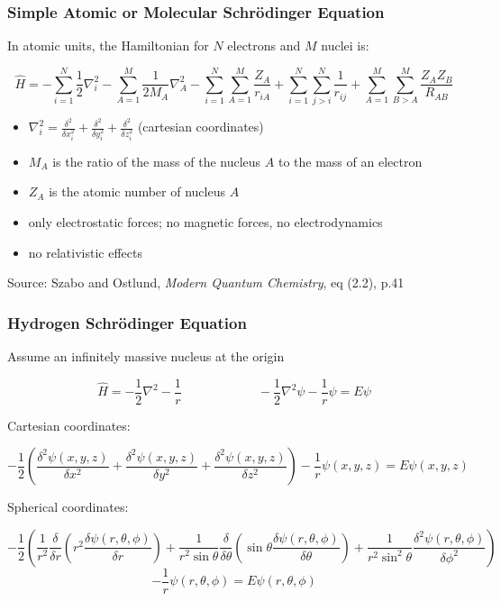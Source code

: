 \documentclass{beamer}
\begin{document}
\begin{frame}
\frametitle{Simple Atomic or Molecular Schr\"odinger Equation}

In atomic units, the Hamiltonian for $N$ electrons and $M$ nuclei is:

\[ \hat{H} = - \sum_{i=1}^N \frac{1}{2} \nabla_i^2 - \sum_{A=1}^M \frac{1}{2M_A}\nabla_A^2 - \sum_{i=1}^{N}\sum_{A=1}^M \frac{Z_A}{r_{iA}}
+ \sum_{i=1}^{N}\sum_{j>i}^N \frac{1}{r_{ij}} + \sum_{A=1}^{M}\sum_{B>A}^M \frac{Z_A Z_B}{R_{AB}}
 \]

\begin{itemize}
\item $ \nabla_i^2 = \frac{\delta^2}{\delta x_i^2} + \frac{\delta^2}{\delta y_i^2} + \frac{\delta^2}{\delta z_i^2}$ (cartesian coordinates)
\item $M_A$ is the ratio of the mass of the nucleus $A$ to the mass of an electron
\item $Z_A$ is the atomic number of nucleus $A$
\item only electrostatic forces; no magnetic forces, no electrodynamics
\item no relativistic effects
\end{itemize}

\vfill
Source: Szabo and Ostlund, {\it Modern Quantum Chemistry}, eq (2.2), p.41
\end{frame}

\begin{frame}
\frametitle{Hydrogen Schr\"odinger Equation}

\begin{center}

Assume an infinitely massive nucleus at the origin

\[ \hat{H} = - \frac{1}{2} \nabla^2 - \frac{1}{r}  \qquad\qquad\qquad - \frac{1}{2} \nabla^2 \psi - \frac{1}{r} \psi = E \psi \]

Cartesian coordinates:

\[ - \frac{1}{2} \left( \frac{\delta^2 \psi(x,y,z)}{\delta x^2} + \frac{\delta^2 \psi(x,y,z)}{\delta y^2} + \frac{\delta^2 \psi(x,y,z)}{\delta z^2} \right) - \frac{1}{r} \psi(x,y,z) = E \psi(x,y,z) \]

Spherical coordinates:

\scriptsize
\[ - \frac{1}{2} \left( \frac{1}{r^2} \frac{\delta}{\delta r}\left(r^2\frac{\delta \psi(r,\theta,\phi)}{\delta r}\right) + \frac{1}{r^2\sin\theta} \frac{\delta}{\delta \theta}\left(\sin\theta\frac{\delta \psi(r,\theta,\phi)}{\delta\theta}\right) + \frac{1}{r^2 \sin^2\theta}\frac{\delta^2 \psi(r,\theta,\phi)}{\delta \phi^2} \right) \]
\[ - \frac{1}{r} \psi(r,\theta,\phi) = E \psi(r,\theta,\phi) \]

\end{center}

\end{frame}
\end{document}
